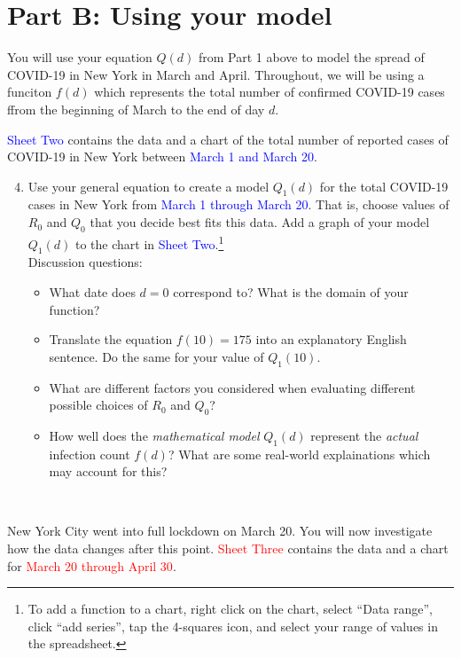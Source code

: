 \documentclass[11pt,reqno,final]{amsart}
\numberwithin{equation}{section}
\numberwithin{figure}{section}
\theoremstyle{definition} %
\begin{document}
\newpage
\section*{Part B: Using your model}

You will use your equation $Q(d)$ from Part 1 above to model the spread of COVID-19 in New York in March and April.
Throughout, we will be using a funciton $f(d)$ which represents the total number of confirmed COVID-19 cases ffrom the beginning of March to the end of day $d$.


\textcolor{blue}{Sheet Two} contains the data and a chart of the total number of reported cases of COVID-19 in New York between \textcolor{blue}{March 1 and March 20}.

\begin{enumerate}[(1)]\setcounter{enumi}{3}\itemsep+20pt
\item  Use your general equation to create a model $Q_1(d)$ for the total COVID-19 cases in New York from \textcolor{blue}{March 1 through March 20}.
        That is, choose values of $R_0$ and $Q_0$ that you decide best fits this data.
        Add a graph of your model $Q_1(d)$ to the chart in \textcolor{blue}{Sheet Two}.\footnote{To add a function to a chart, right click on the chart, select ``Data range'', click ``add series'', tap the 4-squares icon, and select your range of values in the spreadsheet.}\\        
        
        Discussion questions:
        \begin{itemize}
        \item What date does $d=0$ correspond to? What is the domain of your function?
        \item Translate the equation $f(10) = 175$ into an explanatory English sentence. Do the same for your value of $Q_1(10)$.
        \item What are different factors you considered when evaluating different possible choices of $R_0$ and $Q_0$?
        \item How well does the \textit{mathematical model} $Q_1(d)$ represent the \textit{actual} infection count $f(d)$?
                What are some real-world explainations which may account for this?
        \end{itemize}
\end{enumerate}


$ $

New York City went into full lockdown on March 20. You will now investigate how the data changes after this point.
\textcolor{red}{Sheet Three} contains the data and a chart for \textcolor{red}{March 20 through April 30}.
\end{document}
